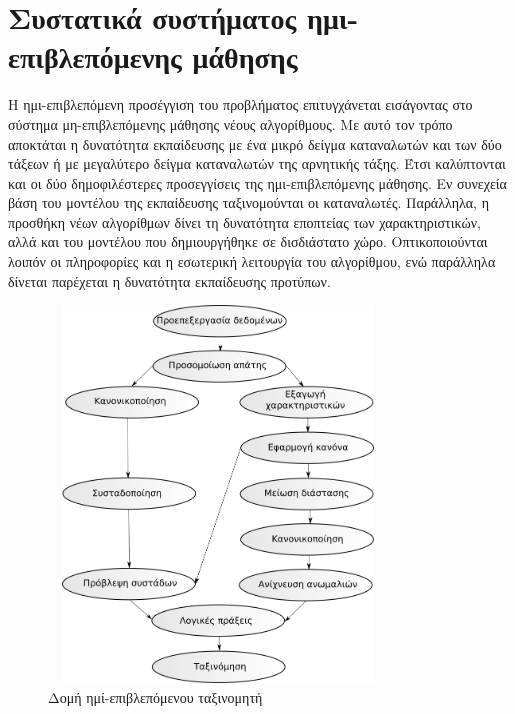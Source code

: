 \section{Συστατικά συστήματος ημι-επιβλεπόμενης μάθησης}
Η ημι-επιβλεπόμενη προσέγγιση του προβλήματος επιτυγχάνεται εισάγοντας στο σύστημα μη-επιβλεπόμενης μάθησης νέους αλγορίθμους. Με αυτό τον τρόπο αποκτάται η δυνατότητα εκπαίδευσης με ένα μικρό δείγμα καταναλωτών και των δύο τάξεων ή με μεγαλύτερο δείγμα καταναλωτών της αρνητικής τάξης. Έτσι καλύπτονται και οι δύο δημοφιλέστερες προσεγγίσεις της ημι-επιβλεπόμενης μάθησης. Εν συνεχεία βάση του μοντέλου της εκπαίδευσης ταξινομούνται οι καταναλωτές. Παράλληλα, η προσθήκη νέων αλγορίθμων δίνει τη δυνατότητα εποπτείας των χαρακτηριστικών, αλλά και του μοντέλου που δημιουργήθηκε σε δισδιάστατο χώρο. Οπτικοποιούνται λοιπόν οι πληροφορίες και η εσωτερική λειτουργία του αλγορίθμου, ενώ παράλληλα δίνεται παρέχεται η δυνατότητα εκπαίδευσης προτύπων.\par
\begin{figure}[ht!]
\centering
 \includegraphics[width=90mm, height=100mm]{../../plots/systems/semi_supervised.png}
 \caption{Δομή ημί-επιβλεπόμενου ταξινομητή}
\label{fig:semisupervisedsystem}
 \end{figure}
 \newpage

